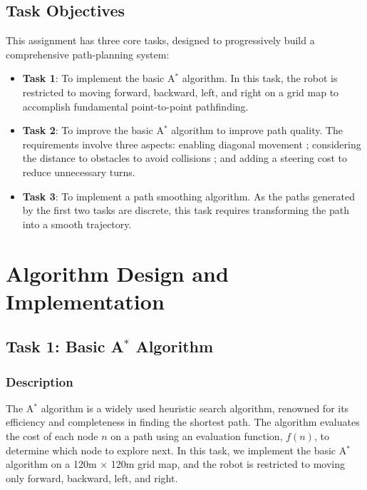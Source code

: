 \documentclass[aps,letterpaper,10pt]{revtex4}
\begin{document}
\subsection{Task Objectives}
This assignment has three core tasks, designed to progressively build a comprehensive path-planning system:
\begin{itemize}
    \item \textbf{Task 1}: To implement the basic A$^*$ algorithm. In this task, the robot is restricted to moving forward, backward, left, and right on a grid map to accomplish fundamental point-to-point pathfinding.

    \item \textbf{Task 2}: To improve the basic A$^*$ algorithm to improve path quality. The requirements involve three aspects: enabling diagonal movement ; considering the distance to obstacles to avoid collisions ; and adding a steering cost to reduce unnecessary turns.

    \item \textbf{Task 3}: To implement a path smoothing algorithm. As the paths generated by the first two tasks are discrete, this task requires transforming the path into a smooth trajectory.
\end{itemize}



\newpage
\section{Algorithm Design and Implementation}
\subsection{Task 1: Basic A$^*$ Algorithm}
\subsubsection{Description}
The A$^*$ algorithm is a widely used heuristic search algorithm, renowned for its efficiency and completeness in finding the shortest path. The algorithm evaluates the cost of each node $n$ on a path using an evaluation function, $f(n)$, to determine which node to explore next. In this task, we implement the basic A$^*$ algorithm on a 120m $\times$ 120m grid map, and the robot is restricted to moving only forward, backward, left, and right.
\end{document}
